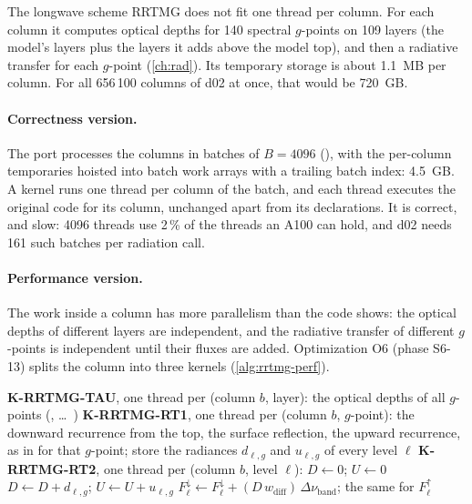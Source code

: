 The longwave scheme RRTMG \citep{iacono2008} does not fit one thread per column. For each column it computes optical
depths for 140 spectral $g$-points on 109 layers (the model's layers plus the layers it adds above the model top), and
then a radiative transfer for each $g$-point (\cref{ch:rad}). Its temporary storage is about 1.1~MB per column. For all
656\,100 columns of d02 at once, that would be 720~GB.

\paragraph{Correctness version.} The port processes the columns in batches of $B = 4096$ (),
with the per-column temporaries hoisted into batch work arrays with a trailing batch index: 4.5~GB. A kernel runs one
thread per column of the batch, and each thread executes the original code for its column, unchanged apart from its
declarations. It is correct, and slow: 4096 threads use 2\,\% of the threads an A100 can hold, and d02 needs 161 such
batches per radiation call.

\paragraph{Performance version.} The work inside a column has more parallelism than the code shows: the optical depths
of different layers are independent, and the radiative transfer of different $g$-points is independent until their
fluxes are added. Optimization O6 (phase S6-13) splits the column into three kernels (\cref{alg:rrtmg-perf}).

\begin{algorithm}[ht]
\caption{The performance version of RRTMG longwave for a batch of $B$ columns (phase S6-13; class R2).}
\label{alg:rrtmg-perf}
\begin{algorithmic}[1]
\State \textbf{K-RRTMG-TAU}, one thread per (column $b$, layer): the optical depths of all $g$-points (,  \dots\ )
\State \textbf{K-RRTMG-RT1}, one thread per (column $b$, $g$-point): the downward recurrence from the top, the
  surface reflection, the upward recurrence, as in  for that $g$-point; store the radiances
  $d_{\ell,g}$ and $u_{\ell,g}$ of every level $\ell$
\State \textbf{K-RRTMG-RT2}, one thread per (column $b$, level $\ell$):
  \State $D \gets 0$; \quad $U \gets 0$
    \State $D \gets D + d_{\ell,g}$; \quad $U \gets U + u_{\ell,g}$
  \EndFor
  \State $F^{\downarrow}_\ell \gets F^{\downarrow}_\ell + (D\,w_{\text{diff}})\,\Delta\nu_{\text{band}}$; \quad
    the same for $F^{\uparrow}_\ell$
\EndFor
\end{algorithmic}
\end{algorithm}

